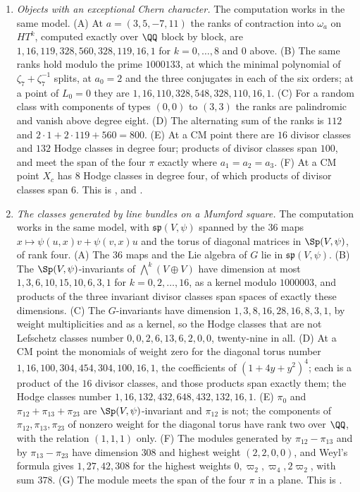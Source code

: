 \begin{enumerate}[label=\textup{(\Roman*)},leftmargin=*]
\item \emph{Objects with an exceptional Chern character.} The computation
  works in the same model. (A) At $a=(3,5,-7,11)$ the ranks of contraction
  into $\omega_{a}$ on $HT^{k}$, computed exactly over $\QQ$ block by block, are
  $1,16,119,328,560,328,119,16,1$ for $k=0,\dots,8$ and $0$ above. (B) The
  same ranks hold modulo the prime $1000133$, at which the minimal polynomial
  of $\zeta_{7}+\zeta_{7}^{-1}$ splits, at $a_{0}=2$ and the three conjugates
  in each of the six orders; at a point of $L_{0}=0$ they are
  $1,16,110,328,548,328,110,16,1$. (C) For a random class with components of
  types $(0,0)$ to $(3,3)$ the ranks are palindromic and vanish above degree
  eight. (D) The alternating sum of the ranks is $112$ and
  $2\cdot1+2\cdot119+560=800$. (E) At a CM point there are $16$ divisor
  classes and $132$ Hodge classes in degree four; products of divisor classes
  span $100$, and meet the span of the four $\pi$ exactly where
  $a_{1}=a_{2}=a_{3}$. (F) At a CM point $X_{c}$ has $8$ Hodge classes in
  degree four, of which products of divisor classes span $6$. This is
  ,  and
  .

\item \emph{The classes generated by line bundles on a Mumford square.} The
  computation works in the same model, with $\mathfrak{sp}(V,\psi)$
  spanned by the $36$ maps $x\mapsto\psi(u,x)v+
  \psi(v,x)u$ and the torus of diagonal matrices in $\Sp(V,\psi)$, of rank
  four. (A) The $36$ maps and the Lie algebra of $G$ lie in
  $\mathfrak{sp}(V,\psi)$. (B) The $\Sp(V,\psi)$-invariants of
  ${\textstyle\bigwedge^{k}}(V\oplus V)$ have dimension at most
  $1,3,6,10,15,10,6,3,1$ for $k=0,2,\dots,16$, as a kernel modulo $1000003$, and products of the three
  invariant divisor classes span spaces of exactly these dimensions. (C) The
  $G$-invariants have dimension $1,3,8,16,28,16,8,3,1$, by weight
  multiplicities and as a kernel, so the Hodge classes that are not
  Lefschetz classes number $0,0,2,6,13,6,2,0,0$, twenty-nine in all. (D) At
  a CM point the monomials of weight zero for the diagonal torus number
  $1,16,100,304,454,304,100,16,1$, the coefficients of $(1+4y+y^{2})^{4}$;
  each is a product of the $16$ divisor classes, and those products span
  exactly them; the Hodge classes number $1,16,132,432,648,432,132,16,1$. (E)
  $\pi_{0}$ and $\pi_{12}+\pi_{13}+\pi_{23}$ are $\Sp(V,\psi)$-invariant and
  $\pi_{12}$ is not; the components of $\pi_{12},\pi_{13},\pi_{23}$ of
  nonzero weight for the diagonal torus have rank two over $\QQ$, with the
  relation $(1,1,1)$ only. (F) The modules generated by $\pi_{12}-\pi_{13}$
  and by $\pi_{13}-\pi_{23}$ have dimension $308$ and highest weight
  $(2,2,0,0)$, and Weyl's formula gives $1,27,42,308$ for the highest weights
  $0,\varpi_{2},\varpi_{4},2\varpi_{2}$, with sum $378$. (G) The module meets
  the span of the four $\pi$ in a plane. This is
  .


\end{enumerate}
